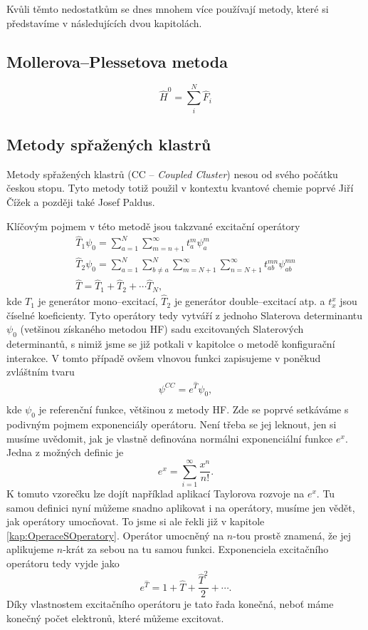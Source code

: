 Kvůli těmto nedostatkům se dnes mnohem více používají metody, které si představíme v následujících dvou kapitolách.

\subsection{Mollerova--Plessetova metoda}


\begin{equation}
\hat{H}^0=\sum_i^N\hat{F}_i
\end{equation}



\subsection{Metody spřažených klastrů}
Metody spřažených klastrů (CC -- \textit{Coupled Cluster}) nesou od svého počátku českou stopu. Tyto metody totiž použil v kontextu kvantové chemie poprvé Jiří Čížek a později také Josef Paldus.

Klíčovým pojmem v této metodě jsou takzvané excitační operátory
\begin{eqnarray}
\hat{T}_1\psi_0=\sum^N_{a=1}\sum_{m=n+1}^\infty t_a^m\psi_a^m \\
\hat{T}_2\psi_0=\sum_{a=1}^N \sum_{b\neq a}^N\sum_{m=N+1}^\infty \sum_{n=N+1}^\infty t_{ab}^{mn}\psi_{ab}^{mn} \\
\hat{T}=\hat{T}_1+\hat{T}_2+\cdots \hat{T}_N ,
\end{eqnarray}
kde $\hat{T_1}$ je generátor mono--excitací, $\hat{T}_2$ je generátor double--excitací atp. a $t_x^x$ jsou číselné koeficienty. Tyto operátory tedy vytváří z jednoho Slaterova determinantu $\psi_0$ (vetšinou získaného metodou HF) sadu excitovaných Slaterových determinantů, s nimiž jsme se již potkali v kapitolce o metodě konfigurační interakce. V tomto případě ovšem vlnovou funkci zapisujeme v poněkud zvláštním tvaru
\begin{eqnarray}
\psi^{CC} = e^{\hat{T}} \psi_0 ,  \\
\end{eqnarray}
kde $\psi_0$ je referenční funkce, většinou z metody HF. Zde se poprvé setkáváme s podivným pojmem exponenciály operátoru. Není třeba se jej leknout, jen si musíme uvědomit, jak je vlastně definována normálni exponenciální funkce $e^x$. Jedna z možných definic je
\begin{equation}
e^x=\sum_{i=1}^\infty \frac{x^n}{n!} .
\end{equation}
K tomuto vzorečku lze dojít například aplikací Taylorova rozvoje na $e^x$.
Tu samou definici nyní můžeme snadno aplikovat i na operátory, musíme jen vědět, jak operátory umocňovat.
To jsme si ale řekli již v kapitole \ref{kap:OperaceSOperatory}. Operátor umocněný na $n$-tou prostě znamená, že jej aplikujeme $n$-krát za sebou na tu samou funkci.
Exponenciela excitačního operátoru tedy vyjde jako 
\begin{equation}
e^{\hat{T}} = 1+\hat{T}+\frac{\hat{T}^2}{2}+\cdots.
\end{equation}
Díky vlastnostem excitačního operátoru je tato řada konečná, neboť máme konečný počet elektronů, které můžeme excitovat.

